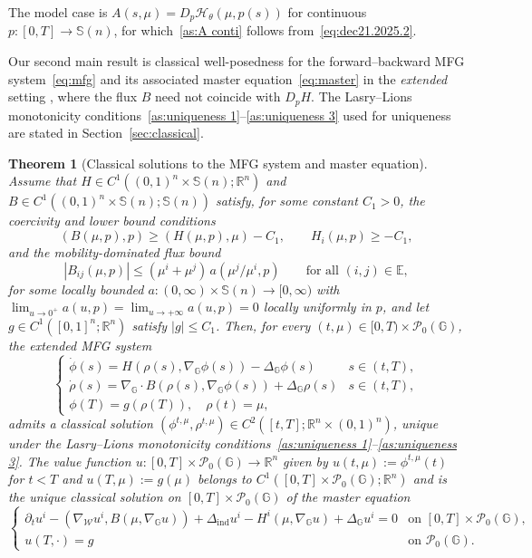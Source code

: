 \documentclass[10pt]{article}
\newtheorem{theorem}{Theorem}[section]
\numberwithin{equation}{section}
\newcommand{\cH}{ \mathcal{H}}
\newcommand{\cP}{ \mathcal{P}}
\newcommand{\cW}{ \mathcal{W}}
\newcommand{\bE}{\mathbb E}
\newcommand{\R}{\mathbb R}
\newcommand{\bS}{\mathbb S}
\def\R{{\mathbb{R}}}
\def\cH{\mathcal{H}}
\def\G{\mathbb{G}}
\begin{document}
The model case is $A(s,\mu)=D_p\cH_\theta(\mu,p(s))$ for continuous $p:[0,T]\to\bS(n)$, for which~\eqref{as:A conti} follows from~\eqref{eq:dec21.2025.2}.

Our second main result is classical well-posedness for the forward--backward MFG system~\eqref{eq:mfg} and its associated master equation~\eqref{eq:master} in the \emph{extended} setting \cite{LiSo20,Mun23}, where the flux $B$ need not coincide with $D_p H$. The Lasry--Lions monotonicity conditions~\eqref{as:uniqueness 1}--\eqref{as:uniqueness 3} used for uniqueness are stated in Section~\ref{sec:classical}.

\begin{theorem}[Classical solutions to the MFG system and master equation]\label{thm:main-mfg}
Assume that $H\in C^1((0,1)^n\times\bS(n);\R^n)$ and $B\in C^1((0,1)^n\times\bS(n);\bS(n))$ satisfy, for some constant $C_1>0$, the coercivity and lower bound conditions
\[
(B(\mu,p),p)\geq (H(\mu,p),\mu)-C_1,\qquad H_i(\mu,p)\geq -C_1,
\]
and the mobility-dominated flux bound
\[
|B_{ij}(\mu,p)|\leq (\mu^i+\mu^j)\,a(\mu^j/\mu^i,p) \qquad \text{for all }(i,j)\in\bE,
\]
for some locally bounded $a:(0,\infty)\times\bS(n)\to[0,\infty)$ with $\lim_{u\to 0^+}a(u,p)=\lim_{u\to +\infty}a(u,p)=0$ locally uniformly in $p$, and let $g\in C^1([0,1]^n;\R^n)$ satisfy $|g|\leq C_1$. Then, for every $(t,\mu)\in[0,T)\times\cP_0(\G)$, the extended MFG system
\begin{equation}\label{eq:mfg}
\begin{cases}
\dot\phi(s)=H(\rho(s),\nabla_\G\phi(s))-\Delta_\G\phi(s) & s\in(t,T),\\
\dot\rho(s)=\nabla_\G\cdot B(\rho(s),\nabla_\G\phi(s))+\Delta_\G\rho(s) & s\in(t,T),\\
\phi(T)=g(\rho(T)),\quad \rho(t)=\mu,
\end{cases}
\end{equation}
admits a classical solution $(\phi^{t,\mu},\rho^{t,\mu})\in C^2([t,T];\R^n\times(0,1)^n)$, unique under the Lasry--Lions monotonicity conditions~\eqref{as:uniqueness 1}--\eqref{as:uniqueness 3}. The value function $u:[0,T]\times\cP_0(\G)\to\R^n$ given by $u(t,\mu):=\phi^{t,\mu}(t)$ for $t<T$ and $u(T,\mu):=g(\mu)$ belongs to $C^1([0,T]\times\cP_0(\G);\R^n)$ and is the unique classical solution on $[0,T]\times\cP_0(\G)$ of the master equation
\begin{equation}\label{eq:master}
\begin{cases}
\partial_t u^i-(\nabla_\cW u^i,B(\mu,\nabla_\G u))+\Delta_\text{ind}u^i-H^i(\mu,\nabla_\G u)+\Delta_\G u^i=0 & \text{on }[0,T]\times\cP_0(\G),\\
u(T,\cdot)=g & \text{on }\cP_0(\G).
\end{cases}
\end{equation}
\end{theorem}
\end{document}
